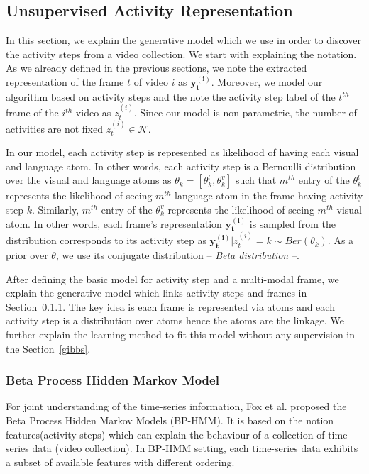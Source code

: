 \subsection{Unsupervised Activity Representation}
\label{basics}
In this section, we explain the generative model which we use in order to discover the activity steps from a video collection. We start with explaining the notation. As we already defined in the previous sections, we note the extracted representation of the frame $t$ of video $i$ as $\mathbf{y^{(i)}_t}$. Moreover, we model our algorithm based on activity steps and the note the activity step label of the $t^{th}$ frame of the $i^{th}$ video as $z^{(i)}_t$. Since our model is non-parametric, the number of activities are not fixed \ie  $z^{(i)}_t \in \mathcal{N}$.

In our model, each activity step is represented as likelihood of having each visual and language atom. In other words, each activity step is a Bernoulli distribution over the visual and language atoms as $\theta_k=[\theta_k^l,\theta_k^v]$ such that $m^{th}$ entry of the $\theta_k^l$ represents the likelihood of seeing $m^{th}$ language atom in the frame having activity step $k$. Similarly, $m^{th}$ entry of the $\theta_k^v$ represents the likelihood of seeing $m^{th}$ visual atom. In other words, each frame's representation $\mathbf{y^{(i)}_t}$ is sampled from the distribution corresponds to its activity step as \mbox{$\mathbf{y^{(i)}_t}|z^{(i)}_t=k \sim Ber(\theta_k)$}. As a prior over $\theta$, we use its conjugate distribution -- \emph{Beta distribution} --.

After defining the basic model for activity step and a multi-modal frame, we explain the generative model which links activity steps and frames in Section~\ref{bphmm}. The key idea is each frame is represented via atoms and each activity step is a distribution over atoms hence the atoms are the linkage. We further explain the learning method to fit this model without any supervision in the Section~\ref{gibbs}.
\subsubsection{Beta Process Hidden Markov Model}
\label{bphmm}
For joint understanding of the time-series information, Fox et al.\cite{foxBPHMM} proposed the Beta Process Hidden Markov Models (BP-HMM). It is based on the notion features(\eg activity steps) which can explain the behaviour of a collection of time-series data (\eg video collection). In BP-HMM setting, each time-series data exhibits a subset of available features with different ordering.

